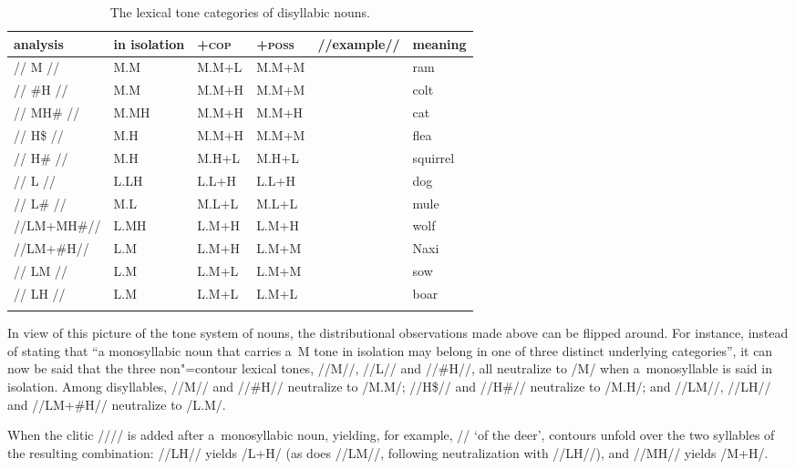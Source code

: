 {{{{{\begin{subtables}
\begin{table}[t!]
\caption{\label{tab:thelexicaltonesofdisyllabicnouns}The lexical tone categories of disyllabic nouns.}
\begin{tabularx}{\textwidth}{ P{21mm} l Q Q P{19mm} Q }
  \lsptoprule
analysis & in isolation & +\textsc{cop} & +\textsc{poss} & //example// & meaning\\ \midrule
// M // & M.M & M.M+L & M.M+M &  & ram\\
// \#H // & M.M & M.M+H & M.M+M &  & colt\\
// MH\# // & M.MH & M.M+H & M.M+H &  & cat\\
// H\$ // & M.H & M.M+H & M.M+M &  & flea\\
// H\# // & M.H & M.H+L & M.H+L &  & squirrel\\
// L // & L.LH & L.L+H & L.L+H &  & dog\\
// L\# // & M.L & M.L+L & M.L+L &  & mule\\
//LM+MH\#// & L.MH & L.M+H & L.M+H &  & wolf\\
//LM+\#H// & L.M & L.M+H & L.M+M &  & Naxi\\
// LM // & L.M & L.M+L & L.M+M &  & sow\\
// LH // & L.M & L.M+L & L.M+L &  & boar\\
\lspbottomrule
\end{tabularx}
\end{table}
\end{subtables}


In view of this picture of the tone system of nouns, the distributional observations made above can be flipped
around. For instance, instead of stating that “a monosyllabic noun that carries a~M tone in
isolation may belong in one of three distinct underlying categories”, it can now be said that the
three non"=contour lexical tones, \mbox{//M//}, //L// and \mbox{//\#H//}, all neutralize to /M/ when a~monosyllable
is said in isolation. Among disyllables, \mbox{//M//} and \mbox{//\#H//} neutralize to /M.M/; \mbox{//H\$//} and \mbox{//H\#//}
neutralize to /M.H/; and \mbox{//LM//}, \mbox{//LH//} and //LM+\#H// neutralize to \mbox{/L.M/}.

When the  clitic //// is added after a~monosyllabic noun, yielding, for example,
// ‘of the deer’, contours unfold over the two syllables of the resulting combination: \mbox{//LH//}
yields /L+H/ (as does \mbox{//LM//}, following neutralization with \mbox{//LH//}), and \mbox{//MH//} yields /M+H/. 

}}}}}
